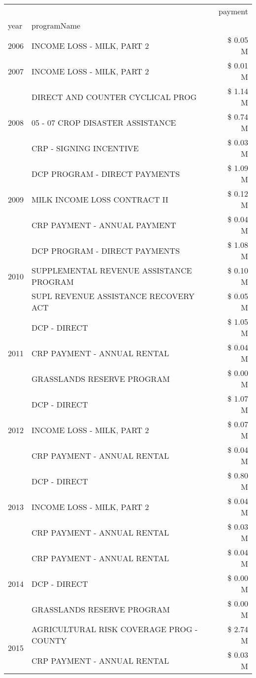 \begin{tabular}{llr}
\toprule
 &  & payment \\
year & programName &  \\
\midrule
2006 & INCOME LOSS - MILK, PART 2 & \$ 0.05 M \\
\cline{1-3}
2007 & INCOME LOSS - MILK, PART 2 & \$ 0.01 M \\
\cline{1-3}
\multirow[t]{3}{*}{2008} & DIRECT AND COUNTER CYCLICAL PROG & \$ 1.14 M \\
 & 05 - 07 CROP DISASTER ASSISTANCE & \$ 0.74 M \\
 & CRP - SIGNING INCENTIVE & \$ 0.03 M \\
\cline{1-3}
\multirow[t]{3}{*}{2009} & DCP PROGRAM - DIRECT PAYMENTS & \$ 1.09 M \\
 & MILK INCOME LOSS CONTRACT II & \$ 0.12 M \\
 & CRP PAYMENT - ANNUAL PAYMENT & \$ 0.04 M \\
\cline{1-3}
\multirow[t]{3}{*}{2010} & DCP PROGRAM - DIRECT PAYMENTS & \$ 1.08 M \\
 & SUPPLEMENTAL REVENUE ASSISTANCE PROGRAM & \$ 0.10 M \\
 & SUPL REVENUE ASSISTANCE RECOVERY ACT & \$ 0.05 M \\
\cline{1-3}
\multirow[t]{3}{*}{2011} & DCP - DIRECT & \$ 1.05 M \\
 & CRP PAYMENT - ANNUAL RENTAL & \$ 0.04 M \\
 & GRASSLANDS RESERVE PROGRAM & \$ 0.00 M \\
\cline{1-3}
\multirow[t]{3}{*}{2012} & DCP - DIRECT & \$ 1.07 M \\
 & INCOME LOSS - MILK, PART 2 & \$ 0.07 M \\
 & CRP PAYMENT - ANNUAL RENTAL & \$ 0.04 M \\
\cline{1-3}
\multirow[t]{3}{*}{2013} & DCP - DIRECT & \$ 0.80 M \\
 & INCOME LOSS - MILK, PART 2 & \$ 0.04 M \\
 & CRP PAYMENT - ANNUAL RENTAL & \$ 0.03 M \\
\cline{1-3}
\multirow[t]{3}{*}{2014} & CRP PAYMENT - ANNUAL RENTAL & \$ 0.04 M \\
 & DCP - DIRECT & \$ 0.00 M \\
 & GRASSLANDS RESERVE PROGRAM & \$ 0.00 M \\
\cline{1-3}
\multirow[t]{3}{*}{2015} & AGRICULTURAL RISK COVERAGE PROG - COUNTY & \$ 2.74 M \\
 & CRP PAYMENT - ANNUAL RENTAL & \$ 0.03 M \\

\end{tabular}
